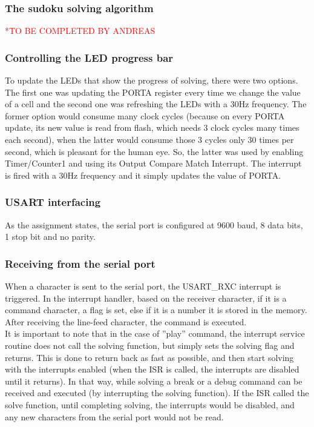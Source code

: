 \documentclass[12pt, a4, hidelinks]{article}
\begin{document}
\subsubsection*{The sudoku solving algorithm}
\textcolor{red}{*TO BE COMPLETED BY ANDREAS}

\subsubsection*{Controlling the LED progress bar}
To update the LEDs that show the progress of solving, there were two options. The first one was updating the PORTA register every time we change the value of a cell and the second one was refreshing the LEDs with a 30Hz frequency. The former option would consume many clock cycles (because on every PORTA update, its new value is read from flash, which needs 3 clock cycles many times each second), when the latter would consume those 3 cycles only 30 times per second, which is pleasant for the human eye. So, the latter was used by enabling Timer/Counter1 and using its Output Compare Match Interrupt. The interrupt is fired with a 30Hz frequency and it simply updates the value of PORTA.

\subsubsection*{USART interfacing}
As the assignment states, the serial port is configured at 9600 baud, 8 data bits, 1 stop bit and no parity.
\subsubsection*{Receiving from the serial port}
When a character is sent to the serial port, the USART\_RXC interrupt is triggered. In the interrupt handler, based on the receiver character, if it is a command character, a flag is set, else if it is a number it is stored in the memory. After receiving the line-feed character, the command is executed. \\
It is important to note that in the case of ''play'' command, the interrupt service routine does not call the solving function, but simply sets the solving flag and returns. This is done to return back as fast as possible, and then start solving with the interrupts enabled (when the ISR is called, the interrupts are disabled until it returns). In that way, while solving a break or a debug command can be received and executed (by interrupting the solving function). If the ISR called the solve function, until completing solving, the interrupts would be disabled, and any new characters from the serial port would not be read.
\end{document}
